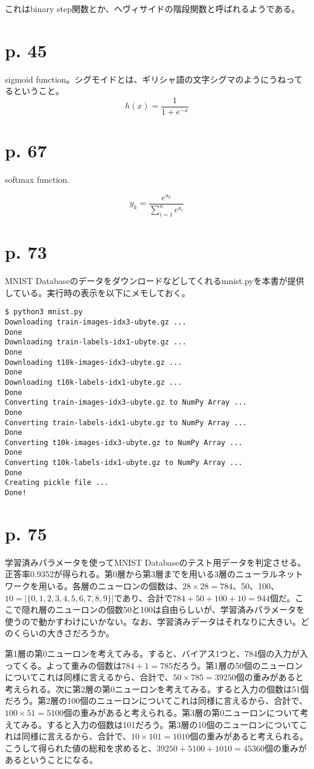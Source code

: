 \documentclass[uplatex,dvipdfmx]{jsarticle} \usepackage{amsmath,amssymb,bm}
\begin{document}
これはbinary step関数とか、ヘヴィサイドの階段関数と呼ばれるようである。
\section*{p. 45}
sigmoid function。シグモイドとは、ギリシャ語の文字シグマのようにうねってるということ。
$$ h(x) = \frac{1}{1+e^{-x}} $$

\section*{p. 67}
softmax function.

$$ y_k = \frac{e^{a_k}}{\sum\limits_{i=1}^n e^{a_i}} $$


\section*{p. 73}
MNIST Databaseのデータをダウンロードなどしてくれるmnist.pyを本書が提供している。実行時の表示を以下にメモしておく。

\begin{verbatim}
$ python3 mnist.py 
Downloading train-images-idx3-ubyte.gz ... 
Done
Downloading train-labels-idx1-ubyte.gz ... 
Done
Downloading t10k-images-idx3-ubyte.gz ... 
Done
Downloading t10k-labels-idx1-ubyte.gz ... 
Done
Converting train-images-idx3-ubyte.gz to NumPy Array ...
Done
Converting train-labels-idx1-ubyte.gz to NumPy Array ...
Done
Converting t10k-images-idx3-ubyte.gz to NumPy Array ...
Done
Converting t10k-labels-idx1-ubyte.gz to NumPy Array ...
Done
Creating pickle file ...
Done!
\end{verbatim}


\section*{p. 75}
学習済みパラメータを使ってMNIST Databaseのテスト用データを判定させる。正答率0.9352が得られる。第0層から第3層までを用いる3層のニューラルネットワークを用いる。各層のニューロンの個数は、$28\times 28=784$、50、100、$10=|\{0, 1, 2, 3, 4, 5, 6, 7, 8, 9\}|$であり、合計で$784+50+100+10=944$個だ。ここで隠れ層のニューロンの個数50と100は自由らしいが、学習済みパラメータを使うので動かすわけにいかない。なお、学習済みデータはそれなりに大きい。どのくらいの大きさだろうか。

第1層の第0ニューロンを考えてみる。すると、バイアス1つと、784個の入力が入ってくる。よって重みの個数は$784+1=785$だろう。第1層の50個のニューロンについてこれは同様に言えるから、合計で、$50\times 785=39250$個の重みがあると考えられる。次に第2層の第0ニューロンを考えてみる。すると入力の個数は51個だろう。第2層の100個のニューロンについてこれは同様に言えるから、合計で、$100\times 51=5100$個の重みがあると考えられる。第3層の第0ニューロンについて考えてみる。すると入力の個数は101だろう。第3層の10個のニューロンについてこれは同様に言えるから、合計で、$10\times 101=1010$個の重みがあると考えられる。こうして得られた値の総和を求めると、$39250+5100+1010=45360$個の重みがあるということになる。
\end{document}
